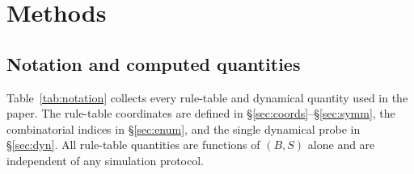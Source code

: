 \documentclass{article}
\begin{document}
\section{Methods}

\subsection{Notation and computed quantities}
\label{sec:notation}

Table~\ref{tab:notation} collects every rule-table and dynamical quantity used in
the paper. The rule-table coordinates are defined in
\S\ref{sec:coords}--\S\ref{sec:symm}, the combinatorial indices in
\S\ref{sec:enum}, and the single dynamical probe in \S\ref{sec:dyn}. All
rule-table quantities are functions of $(B,S)$ alone and are independent of any
simulation protocol.
\end{document}
